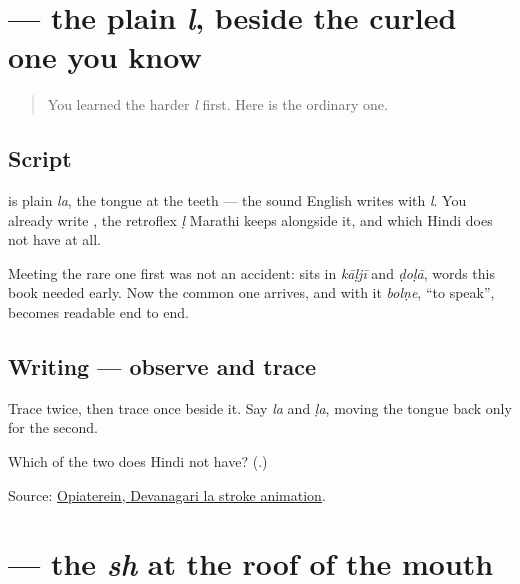 \section[\texorpdfstring{\mr{ल} (la)}{ल (la)}]{ — the plain \emph{l}, beside the curled one you know}

\label{lesson:MR-W08-la}



\begin{quote}
You learned the harder \emph{l} first. Here is the ordinary one.
\end{quote}

\subsection*{Script}
\begin{quote}
\end{quote}

\textbf{} is plain \emph{la}, the tongue at the teeth — the sound English writes with \emph{l}. You already write \textbf{}, the retroflex \emph{ḷ} Marathi keeps alongside it, and which Hindi does not have at all.

Meeting the rare one first was not an accident: \textbf{} sits in \emph{kāḷjī} and \emph{ḍoḷā}, words this book needed early. Now the common one arrives, and with it \emph{bolṇe}, \textquotedblleft{}to speak\textquotedblright{}, becomes readable end to end.

\subsection*{Writing — observe and trace}

Trace \textbf{} twice, then trace \textbf{} once beside it. Say \emph{la} and \emph{ḷa}, moving the tongue back only for the second.

\begin{tcolorbox}[breakable,colback=teal!4,colframe=teal!35!black,title={Before you move on}]
Which of the two does Hindi not have? (\textbf{}.)

Source: \href{https://commons.wikimedia.org/wiki/File:Deva-\%E0\%A4\%B2-order.gif}{Opiaterein, Devanagari la stroke animation}.
\end{tcolorbox}
\section[\texorpdfstring{\mr{श} (śa)}{श (śa)}]{ — the \emph{sh} at the roof of the mouth}

